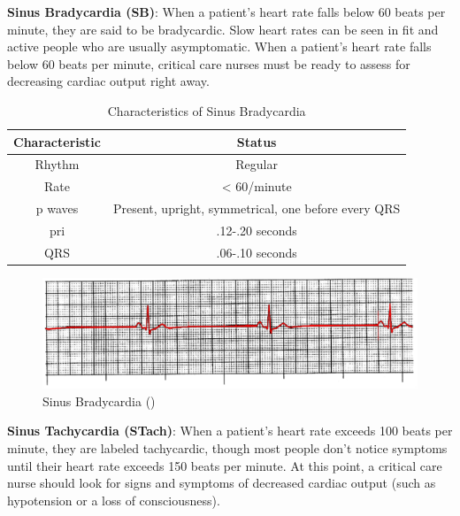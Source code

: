 \textbf{Sinus Bradycardia (SB)}: When a patient's heart rate falls below 60 beats per minute, they are said to be bradycardic. Slow heart rates can be seen in fit and active people who are usually asymptomatic. When a patient's heart rate falls below 60 beats per minute, critical care nurses must be ready to assess for decreasing cardiac output right away.

\begin{table}[H]
\begin{center}
\begin{tabular}{||c || c||}
 \hline
\textbf{Characteristic} & \textbf{Status} \\ [0.4ex] 
 \hline
 Rhythm & Regular \\
\hline\hline
Rate & < 60/minute \\
\hline
p waves & Present, upright, symmetrical, one before every QRS \\
\hline
pri & .12-.20 seconds \\
\hline
QRS & .06-.10 seconds \\
\hline\hline
\end{tabular}
\end{center}
\caption{Characteristics of Sinus Bradycardia}
\label{table:sb_characteristics}
\end{table}


 \begin{figure}[H]
\centering
\includegraphics[scale=0.85]{img/SB.png}
\caption{Sinus Bradycardia (\cite{arryth_types})}
\label{fig:sb}
\end{figure}

\textbf{Sinus Tachycardia (STach)}: When a patient's heart rate exceeds 100 beats per minute, they are labeled tachycardic, though most people don't notice symptoms until their heart rate exceeds 150 beats per minute. At this point, a critical care nurse should look for signs and symptoms of decreased cardiac output (such as hypotension or a loss of consciousness).

